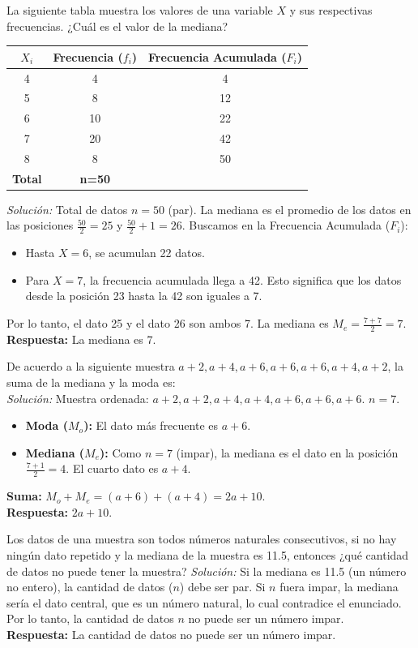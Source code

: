 \documentclass[12pt, letterpaper]{article}
\begin{document}
\vspace{1em}
\noindent La siguiente tabla muestra los valores de una variable \(X\) y sus respectivas frecuencias. ¿Cuál es el valor de la mediana?
\begin{center}
	\begin{tabular}{|c|c|c|}
		\hline
		\textbf{\(X_i\)} & \textbf{Frecuencia ($f_i$)} & \textbf{Frecuencia Acumulada ($F_i$)} \\
		\hline
		4 & 4 & 4 \\ \hline
		5 & 8 & 12 \\ \hline
		6 & 10 & 22 \\ \hline
		7 & 20 & 42 \\ \hline
		8 & 8 & 50 \\ \hline
		\textbf{Total} & \textbf{n=50} & \\
		\hline
	\end{tabular}
\end{center}
\textit{Solución:}
Total de datos $n=50$ (par). La mediana es el promedio de los datos en las posiciones $\frac{50}{2}=25$ y $\frac{50}{2}+1 = 26$.
Buscamos en la Frecuencia Acumulada ($F_i$):
\begin{itemize}
	\item Hasta $X=6$, se acumulan 22 datos.
	\item Para $X=7$, la frecuencia acumulada llega a 42. Esto significa que los datos desde la posición 23 hasta la 42 son iguales a 7.
\end{itemize}
Por lo tanto, el dato 25 y el dato 26 son ambos 7.
La mediana es $M_e = \frac{7+7}{2} = 7$. \\
\textbf{Respuesta:} La mediana es 7.

\vspace{1em}
\noindent De acuerdo a la siguiente muestra \(a+2, a+4, a+6, a+6, a+6, a+4, a+2\), la suma de la mediana y la moda es: \\
\textit{Solución:}
Muestra ordenada: \(a+2, a+2, a+4, a+4, a+6, a+6, a+6\). $n=7$.
\begin{itemize}
	\item \textbf{Moda ($M_o$):} El dato más frecuente es \(a+6\).
	\item \textbf{Mediana ($M_e$):} Como $n=7$ (impar), la mediana es el dato en la posición $\frac{7+1}{2}=4$. El cuarto dato es \(a+4\).
\end{itemize}
\textbf{Suma:} $M_o + M_e = (a+6) + (a+4) = 2a+10$.\\
\textbf{Respuesta:} $2a+10$.

\vspace{1em}
\noindent Los datos de una muestra son todos números naturales consecutivos, si no hay ningún dato repetido y la mediana de la muestra es 11.5, entonces ¿qué cantidad de datos no puede tener la muestra?
\textit{Solución:}
Si la mediana es 11.5 (un número no entero), la cantidad de datos ($n$) debe ser par. Si $n$ fuera impar, la mediana sería el dato central, que es un número natural, lo cual contradice el enunciado.
Por lo tanto, la cantidad de datos $n$ no puede ser un número impar. \\
\textbf{Respuesta:} La cantidad de datos no puede ser un número impar.
\newpage
\end{document}
